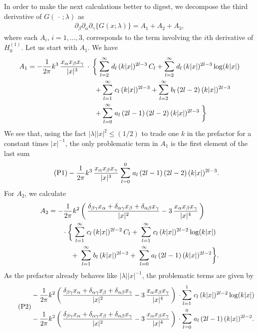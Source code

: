 In order to make the next calculations better to digest, we decompose the third derivative of $G(\,\cdot\, ; \lambda)$ as 
\begin{align*}
  \partial_\beta \partial_\alpha \partial_\gamma \big\{G(x; \lambda)\big\}
  = A_1 + A_2 + A_3,
\end{align*}
where each $A_i$, $i = 1,\dots,3$, corresponds to the term involving the $i$th derivative of $H_0^{(1)}$.
Let us start with $A_1$. 
We have
\begin{align*}
  A_1 = - \frac{1}{2 \pi } k^3 \, \frac{x_\alpha x_\beta x_\gamma}{|x|^3}  \,
  &\cdot\,\bigg\{
     \; \mathlarger{\sum}_{l = 2}^\infty \; d_l \, (k|x|)^{2l - 3} \, C_l +  \mathlarger{\sum}_{l = 2}^\infty \; d_l \, (k|x|)^{2l - 3} \log(k|x|)  \\
  &\quad\,  +  \mathlarger{\sum}_{l = 1}^\infty \; c_l \, (k|x|)^{2l - 3} +  \mathlarger{\sum}_{l = 2}^\infty \; b_l\, (2l - 2) \, (k|x|)^{2l - 3} \\
  &\quad\, +  \mathlarger{\sum}_{l = 0}^\infty \; a_l \, (2l - 1)\, (2l - 2) \, (k|x|)^{2l - 3} \;
  \bigg\}
\end{align*}
We see that, using the fact $|\lambda| |x|^2 \leq (1/2)$ to trade one $k$ in the prefactor for a constant times $|x|^{-1}$, the only problematic term in $A_1$ is the first element of the last sum
\begin{align}
  \label{eq:P1}
  \tag{P1}- \frac{1}{2 \pi } k^3\, \frac{x_\alpha x_\beta x_\gamma}{|x|^3}  \; \mathlarger{\sum}_{l = 0}^{0} \; a_l \, (2l - 1)\, (2l - 2) \, (k|x|)^{2l - 3} .
\end{align}
For $A_2$, we calculate
\begin{align*}
  A_2 &= - \frac{1}{2\pi} k^2\, \bigg(\, \frac{\delta_{\beta\gamma} x_\alpha + \delta_{\alpha \gamma} x_\beta + \delta_{\alpha \beta} x_\gamma}{|x|^2} - 3\, \frac{x_\alpha x_\beta x_\gamma}{|x|^4} \, \bigg) \\ 
  &\qquad \cdot 
  \bigg\{
    \; \mathlarger{\sum}_{l = 1}^\infty \; c_l \, (k|x|)^{2l - 2} \, C_l 
  + \; \mathlarger{\sum}_{l = 1}^\infty \; c_l \, (k|x|)^{2l - 2} \log(k|x|) \\
  &\qquad\quad\,+ \; \mathlarger{\sum}_{l = 1}^\infty \; b_l \, (k|x|)^{2l - 2} 
  + \; \mathlarger{\sum}_{l = 0}^\infty \; a_l\, (2l - 1) \, (k|x|)^{2l - 2} 
  \bigg\}.
\end{align*}
As the prefactor already behaves like $|\lambda| |x|^{-1}$, the problematic terms are given by
\begin{align}
  \label{eq:P2}
  \tag{P2}
  \begin{alignedat}{1}
  & - \frac{1}{2\pi} k^2\, \bigg(\, \frac{\delta_{\beta\gamma} x_\alpha + \delta_{\alpha \gamma} x_\beta + \delta_{\alpha \beta} x_\gamma}{|x|^2} - 3\, \frac{x_\alpha x_\beta x_\gamma}{|x|^4} \, \bigg) 
   \, \cdot \mathlarger{\sum}_{l = 1}^1 \; c_l \, (k|x|)^{2l - 2} \log(k|x|) \\
   &- \frac{1}{2\pi} k^2 \,\bigg(\, \frac{\delta_{\beta\gamma} x_\alpha + \delta_{\alpha \gamma} x_\beta + \delta_{\alpha \beta} x_\gamma}{|x|^2} - 3\, \frac{x_\alpha x_\beta x_\gamma}{|x|^4} \, \bigg) 
  \, \cdot \mathlarger{\sum}_{l = 0}^0 \; a_l\, (2l - 1) \, (k|x|)^{2l - 2} .
  \end{alignedat}
\end{align}
